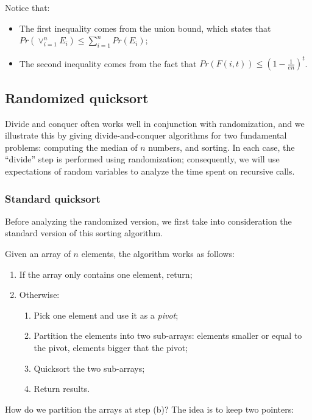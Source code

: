 Notice that:

\begin{itemize}
    \item The first inequality comes from the union bound, which states that $Pr \left( \lor_{i = 1}^n E_i \right) \leq \sum_{i = 1}^n Pr(E_i)$;
    \item The second inequality comes from the fact that $Pr(F(i,t)) \leq (1-\frac{1}{en})^t$.
\end{itemize}

\subsection{Randomized quicksort}
Divide and conquer often works well in conjunction with randomization, and we illustrate this by giving divide-and-conquer algorithms for two fundamental problems: computing the median of $n$ numbers, and sorting. In each case, the “divide” step is performed using randomization; consequently, we will use expectations of random variables to analyze the time spent on recursive calls.

\subsubsection{Standard quicksort}
Before analyzing the randomized version, we first take into consideration the standard version of this sorting algorithm.

Given an array of $n$ elements, the algorithm works as follows:
\begin{enumerate}
    \item If the array only contains one element, return;
    \item Otherwise:
    \begin{enumerate}
        \item Pick one element and use it as a \textit{pivot};
        \item Partition the elements into two sub-arrays: elements smaller or equal to the pivot, elements bigger that the pivot;
        \item Quicksort the two sub-arrays;
        \item Return results.
    \end{enumerate}
\end{enumerate}

How do we partition the arrays at step (b)? The idea is to keep two pointers:

